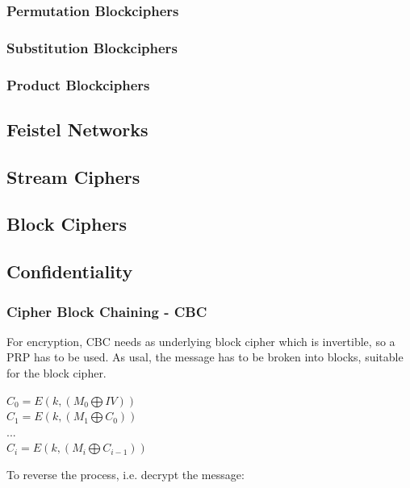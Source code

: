 \subsubsection{Permutation Blockciphers}

\subsubsection{Substitution Blockciphers}

\subsubsection{Product Blockciphers}

\subsection{Feistel Networks}

\subsection{Stream Ciphers}

\subsection{Block Ciphers}

\subsection{Confidentiality}\label{confidentiality}

\subsubsection{Cipher Block Chaining - CBC}

For encryption, CBC needs as underlying block cipher which is invertible, so a PRP has to be used. 
As usal, the message has to be broken into blocks, suitable for the block cipher. 

\begin{center}
$ C_0 = E(k, (M_0 \bigoplus IV ) )  $
\\
$ C_1 = E(k, (M_1  \bigoplus C_0) ) $
\\
$...$
\\
$ C_i = E(k, (M_i \bigoplus C_{i-1} ) )  $
\end{center}

To reverse the process, i.e. decrypt the message:

